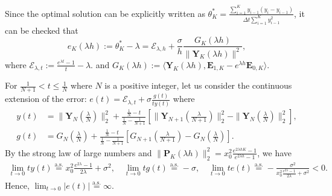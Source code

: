 \documentclass[final]{siamltex}
\begin{document}
\begin{appendices}
Since the optimal solution can be explicitly written as 
$\theta^*_K = \frac{\sum_{i = 1}^{K} y_{i -1} (y_i - y_{i-1})}{\Delta t \sum_{i = 1}^{K} y_{i-1}^2}$, it can be checked that 
\begin{equation} \label{eqn:strong-form-solution}
    e_K(\lambda h):=\theta^*_K - \lambda = \mathcal{E}_{\lambda,h} + \frac{\sigma}{h}\frac{G_K(\lambda h)}{\|\bm{Y}_K(\lambda h)\|^2},
\end{equation}
where $\mathcal{E}_{\lambda,t}:= \frac{e^{\lambda t} - 1}{t}-\lambda$.
and $G_K(\lambda h):= \langle \bm{Y}_K(\lambda h), \bm{E}_{1,K} - e^{\lambda h}\bm{E}_{0,K}\rangle$.


For $\frac{1}{N+1} < t \le \frac{1}{N}$ where $N$ is a positive integer,
let us consider the continuous extension of the error: $e(t)= \mathcal{E}_{\lambda,t} + \sigma \frac{g(t)}{ty(t)}$ where 
\begin{align*}
    y(t) &= \|\bm{Y}_N(\frac{\lambda}{N})\|_2^2 + \frac{\frac{1}{N}-t}{\frac{1}{N}-\frac{1}{N+1}} \left[\|\bm{Y}_{N+1}(\frac{\lambda}{N+1})\|_2^2 - \|\bm{Y}_N(\frac{\lambda}{N})\|_2^2\right], \\
    g(t) &= G_N(\frac{\lambda}{N})+ \frac{\frac{1}{N}-t}{\frac{1}{N}-\frac{1}{N+1}} 
    \left[G_{N+1}(\frac{\lambda}{N+1}) - G_N(\frac{\lambda}{N}) \right].
\end{align*}
By the strong law of large numbers and $\|\bm{P}_K(\lambda h)\|_2^2 = x_0^2\frac{e^{2\lambda hK}-1}{e^{2\lambda h}-1}$, we have
\begin{align*}
    \lim_{t \to 0} t y(t) \overset{\text{a.s.}}{=} x_0^2 \frac{e^{2\lambda}-1}{2\lambda}+ \sigma^2,
    \quad 
    \lim_{t \to 0} t g(t) \overset{\text{a.s.}}{=} -\sigma, 
    \quad 
    \lim_{t \to 0} t e(t) \overset{\text{a.s.}}{=} -\frac{\sigma^2}{x_0^2 \frac{e^{2\lambda}-1}{2\lambda}+ \sigma^2} < 0. 
\end{align*}
Hence, $\lim_{t \to 0} |e(t)|\overset{\text{a.s.}}{=} \infty$.



\end{appendices}
\end{document}
